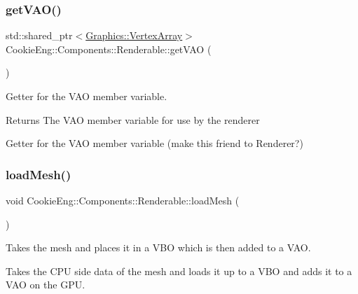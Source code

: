 \subsubsection{\texorpdfstring{get\+V\+A\+O()}{getVAO()}}
{\footnotesize\ttfamily std\+::shared\+\_\+ptr$<$\hyperlink{class_cookie_eng_1_1_graphics_1_1_vertex_array}{Graphics\+::\+Vertex\+Array}$>$ Cookie\+Eng\+::\+Components\+::\+Renderable\+::get\+V\+AO (\begin{DoxyParamCaption}{ }\end{DoxyParamCaption})\hspace{0.3cm}{\ttfamily [inline]}}



Getter for the V\+AO member variable. 

\begin{DoxyReturn}{Returns}
The V\+AO member variable for use by the renderer
\end{DoxyReturn}
Getter for the V\+AO member variable (make this friend to Renderer?) \mbox{\label{class_cookie_eng_1_1_components_1_1_renderable_a8d51c4b3588d81811043a8cce0904c0d}} 
\subsubsection{\texorpdfstring{load\+Mesh()}{loadMesh()}}
{\footnotesize\ttfamily void Cookie\+Eng\+::\+Components\+::\+Renderable\+::load\+Mesh (\begin{DoxyParamCaption}{ }\end{DoxyParamCaption})}



Takes the mesh and places it in a V\+BO which is then added to a V\+AO. 

Takes the C\+PU side data of the mesh and loads it up to a V\+BO and adds it to a V\+AO on the G\+PU. \mbox{\label{class_cookie_eng_1_1_components_1_1_renderable_a5ea9d1153bbe51b264c20102f8c72db9}} 
